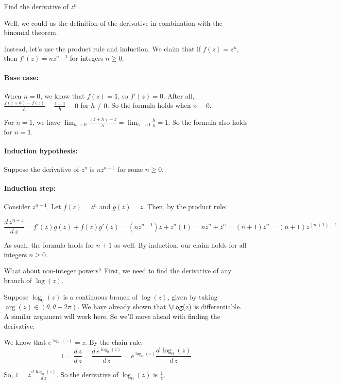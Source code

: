 \begin{ex}{}{} Find the derivative of $z^n$.

Well, we could us the definition of the derivative in combination with the binomial theorem.

Instead, let's use the product rule and induction. We claim that if $f(z) = z^n$, then $f'(z) = nz^{n-1}$ for integers $n \ge 0$.

\paragraph{Base case:} When $n = 0$, we know that $f(z) = 1$, so $f'(z) = 0$. After all, $\frac{f(z + h) - f(z)}{h} = \frac{1-1}{h} = 0$ for $h\ne 0$. So the formula holds when $n = 0$.

For $n = 1$, we have $\lim_{h\rightarrow 0} \frac{(z+h) - z}{h} = \lim_{h\rightarrow 0} \frac{h}{h} = 1$. So the formula also holds for $n = 1$.

\paragraph{Induction hypothesis:} Suppose the derivative of $z^n$ is $nz^{n-1}$ for some $n\ge 0$.

\paragraph{Induction step:} Consider $z^{n+1}$. Let $f(z) = z^n$ and $g(z) = z$. Then, by the product rule:

$$\frac{d\, z^{n+1}}{d\,z} = f'(z)g(z) + f(z)g'(z) = (nz^{n-1})z + z^n(1) = nz^n + z^n = (n+1)z^n = (n+1)z^{(n+1)-1}$$

As such, the formula holds for $n+1$ as well. By induction, our claim holds for all integers $n\ge 0$.

\end{ex}

What about non-integer powers? First, we need to find the derivative of any branch of $\log(z)$.

\begin{ex}{}{} Suppose $\log_0(z)$ is a continuous branch of $\log(z)$, given by taking $\arg(z) \in (\theta,\theta + 2\pi)$. We have already shown that $\Log(z)$ is differentiable. A similar argument will work here. So we'll move ahead with finding the derivative.

We know that $e^{\log_0(z)} = z$. By the chain rule:
$$1 = \frac{d\,z}{d\,z} = \frac{d \, e^{\log_0(z)}}{d\, z} = e^{\log_0(z)}\frac{d\, \log_0(z)}{d\,z}$$

So, $1 = z\frac{d\,\log_0(z)}{d\,z}$. So the derivative of $\log_0(z)$ is $\frac{1}{z}$.
\end{ex}

